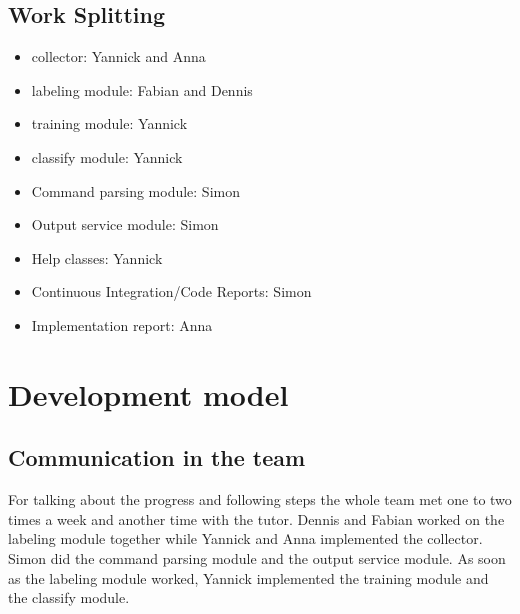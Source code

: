 \documentclass[parskip=full]{scrartcl}
\begin{document}
\subsection{Work Splitting}
\begin{itemize}

\item \Gls{collector}: Yannick and Anna

\item \Gls{labeling module}: Fabian and Dennis

\item \Gls{training module}: Yannick

\item \Gls{classify module}: Yannick

\item Command parsing module: Simon

\item Output service module: Simon

\item Help classes: Yannick

\item Continuous Integration/Code Reports: Simon

\item Implementation report: Anna

\end{itemize}


\section{Development model}
\subsection{Communication in the team}
For talking about the progress and following steps the whole team met one to two times a week and another time with the tutor.
Dennis and Fabian worked on the \gls{labeling module} together while Yannick and Anna implemented the \gls{collector}.
Simon did the command parsing module and the output service module.
As soon as the \gls{labeling module} worked, Yannick implemented the \gls{training module} and the \gls{classify module}.
\end{document}
